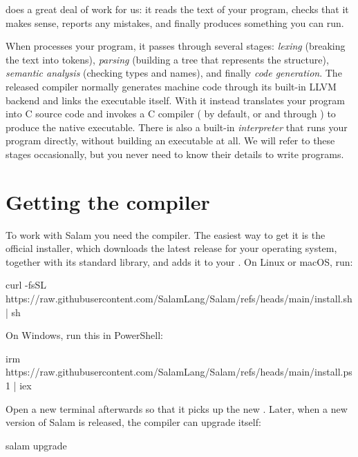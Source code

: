  does a great deal of work for us: it reads the text of your
program, checks that it makes sense, reports any mistakes, and finally produces
something you can run.

\begin{deep}
When  processes your program, it passes through several stages:
\emph{lexing} (breaking the text into tokens), \emph{parsing} (building a tree
that represents the structure), \emph{semantic analysis} (checking types and
names), and finally \emph{code generation}. The released compiler normally
generates machine code through its built-in LLVM backend and links the
executable itself. With  it instead translates your program
into C source code and invokes a C compiler ( by default, or
 and  through ) to produce the native
executable. There is also a built-in \emph{interpreter} that runs your program
directly, without building an executable at all. We will refer to these stages
occasionally, but you never need to know their details to write programs.
\end{deep}

\section{Getting the compiler}

To work with Salam you need the  compiler. The easiest way to get
it is the official installer, which downloads the latest release for your
operating system, together with its standard library, and adds it to your
. On Linux or macOS, run:

\begin{shell}
curl -fsSL https://raw.githubusercontent.com/SalamLang/Salam/refs/heads/main/install.sh | sh
\end{shell}

\noindent On Windows, run this in PowerShell:

\begin{shell}
irm https://raw.githubusercontent.com/SalamLang/Salam/refs/heads/main/install.ps1 | iex
\end{shell}

Open a new terminal afterwards so that it picks up the new . Later,
when a new version of Salam is released, the compiler can upgrade itself:

\begin{shell}
salam upgrade
\end{shell}

